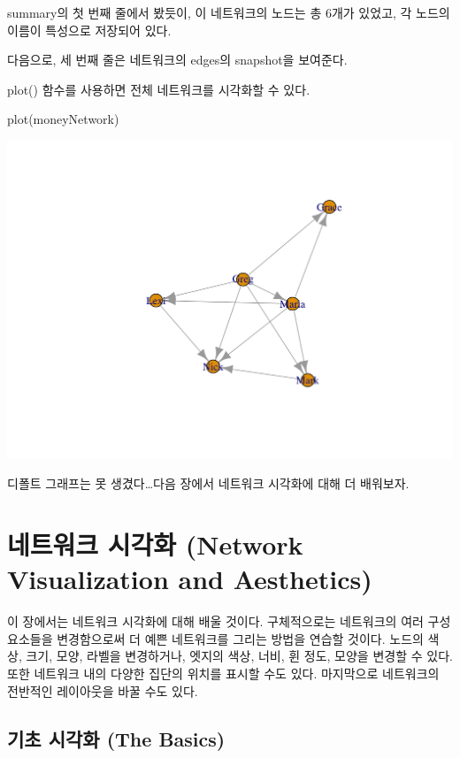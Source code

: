 \documentclass[
]{book}
\newenvironment{Shaded}{\begin{snugshade}}{\end{snugshade}}
\newcommand{\FunctionTok}[1]{\textcolor[rgb]{0.00,0.00,0.00}{#1}}
\newcommand{\NormalTok}[1]{#1}
\begin{document}
summary의 첫 번째 줄에서 봤듯이, 이 네트워크의 노드는 총 6개가 있었고, 각 노드의 이름이 특성으로 저장되어 있다.

다음으로, 세 번째 줄은 네트워크의 edges의 snapshot을 보여준다.

plot() 함수를 사용하면 전체 네트워크를 시각화할 수 있다.

\begin{Shaded}
\begin{Highlighting}[]
\FunctionTok{plot}\NormalTok{(moneyNetwork)}
\end{Highlighting}
\end{Shaded}

\begin{center}\includegraphics[width=0.8\linewidth]{images/1} \end{center}

디폴트 그래프는 못 생겼다\ldots 다음 장에서 네트워크 시각화에 대해 더 배워보자.

\hypertarget{uxb124uxd2b8uxc6ccuxd06c-uxc2dcuxac01uxd654-network-visualization-and-aesthetics}{%
\chapter{네트워크 시각화 (Network Visualization and Aesthetics)}\label{uxb124uxd2b8uxc6ccuxd06c-uxc2dcuxac01uxd654-network-visualization-and-aesthetics}}

이 장에서는 네트워크 시각화에 대해 배울 것이다. 구체적으로는 네트워크의 여러 구성 요소들을 변경함으로써 더 예쁜 네트워크를 그리는 방법을 연습할 것이다. 노드의 색상, 크기, 모양, 라벨을 변경하거나, 엣지의 색상, 너비, 휜 정도, 모양을 변경할 수 있다. 또한 네트워크 내의 다양한 집단의 위치를 표시할 수도 있다. 마지막으로 네트워크의 전반적인 레이아웃을 바꿀 수도 있다.

\hypertarget{uxae30uxcd08-uxc2dcuxac01uxd654-the-basics}{%
\section{기초 시각화 (The Basics)}\label{uxae30uxcd08-uxc2dcuxac01uxd654-the-basics}}
\end{document}
